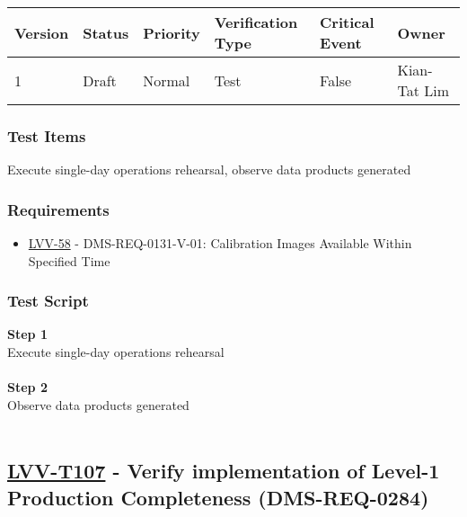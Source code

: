 \begin{longtable}[]{@{}llllll@{}}
\toprule
Version & Status & Priority & Verification Type & Critical Event &
Owner\tabularnewline
\midrule
\endhead
1 & Draft & Normal & Test & False & Kian-Tat Lim\tabularnewline
\bottomrule
\end{longtable}

\hypertarget{test-items-6}{%
\subsubsection{Test Items}\label{test-items-6}}

Execute single-day operations rehearsal, observe data products generated

\hypertarget{requirements-6}{%
\subsubsection{Requirements}\label{requirements-6}}

\begin{itemize}
\tightlist
\item
  \href{https://jira.lsstcorp.org/browse/LVV-58}{LVV-58} -
  DMS-REQ-0131-V-01: Calibration Images Available Within Specified Time
\end{itemize}

\hypertarget{test-script-6}{%
\subsubsection{Test Script}\label{test-script-6}}

\textbf{Step 1}\\
Execute single-day operations rehearsal\\
~\\
\textbf{Step 2}\\
\hspace*{0.333em}Observe data products generated\\
~\\

\hypertarget{lvv-t107---verify-implementation-of-level-1-production-completeness-dms-req-0284}{%
\subsection{\texorpdfstring{\href{https://jira.lsstcorp.org/secure/Tests.jspa\#/testCase/LVV-T107}{LVV-T107}
- Verify implementation of Level-1 Production Completeness
(DMS-REQ-0284)}{LVV-T107 - Verify implementation of Level-1 Production Completeness (DMS-REQ-0284)}}\label{lvv-t107---verify-implementation-of-level-1-production-completeness-dms-req-0284}}


